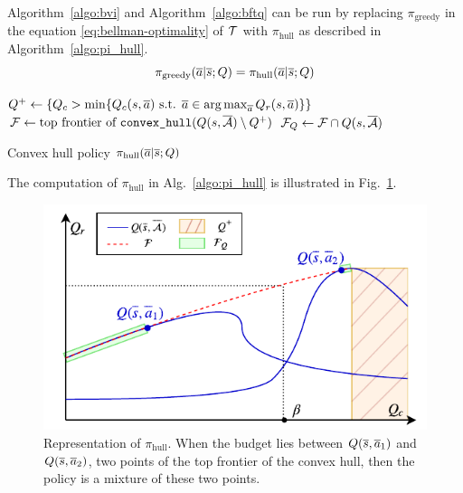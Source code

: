 \documentclass{article}
\begin{document}
\begin{proposition}
\label{prop:bftq_pi_hull}
Algorithm~\ref{algo:bvi} and Algorithm~\ref{algo:bftq} can be run by replacing $\pi_\text{greedy}$ in the equation \eqref{eq:bellman-optimality} of $\mathcal{T}$ with $\pi_\text{hull}$ as described in Algorithm~\ref{algo:pi_hull}.
\begin{equation*}
    \pi_\text{greedy}(\overline{a}|\overline{s}; Q) = \pi_\text{hull}(\overline{a}|\overline{s}; Q)
\end{equation*}
\end{proposition}

\begin{algorithm}
\DontPrintSemicolon
{}
$Q^+\leftarrow \{Q_c > \min \{Q_c(s,\overline{a}) \text{ s.t. }\overline{a}\in\operatorname*{arg\,max}_{\overline{a}} Q_r(s,\overline{a})\} \}$\;
$\mathcal{F} \leftarrow \text{top frontier of }\texttt{convex\_hull}(Q(s,\overline{\mathcal{A}}) \setminus Q^+)$\;
$\mathcal{F}_Q \leftarrow \mathcal{F}\cap Q(s,\overline{\mathcal{A}})$\;
\caption{Convex hull policy $\pi_\text{hull}(\overline{a}|\overline{s}; Q)$}
\label{algo:pi_hull}
\end{algorithm}

The computation of $\pi_\text{hull}$ in Alg.~\ref{algo:pi_hull} is illustrated in Fig.~\ref{fig:hull}.

\begin{figure}
    \centering
    \includegraphics[width=\linewidth]{source/img/pi.pdf}
    \caption{Representation of $\pi_\text{hull}$. When the budget lies between $Q(\overline{s},\overline{a}_1)$ and $Q(\overline{s},\overline{a}_2)$, two points of the top frontier of the convex hull, then the policy is a mixture of these two points.}
    \label{fig:hull}
\end{figure}
\end{document}
